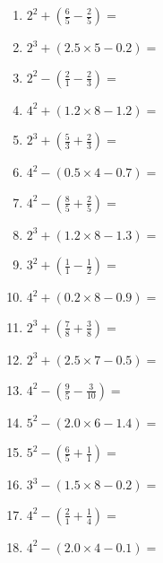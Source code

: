 \documentclass[12pt]{article}
\begin{document}
\begin{enumerate}
\item \large $ 2^{2} + (\frac{6}{5} - \frac{2}{5}) = $ \vspace{1.6cm}
\item \large $ 2^{3} + (2.5 \times 5 - 0.2) = $ \vspace{1.6cm}
\item \large $ 2^{2} - (\frac{2}{1} - \frac{2}{3}) = $ \vspace{1.6cm}
\item \large $ 4^{2} + (1.2 \times 8 - 1.2) = $ \vspace{1.6cm}
\newpage
\item \large $ 2^{3} + (\frac{5}{3} + \frac{2}{3}) = $ \vspace{1.6cm}
\item \large $ 4^{2} - (0.5 \times 4 - 0.7) = $ \vspace{1.6cm}
\item \large $ 4^{2} - (\frac{8}{5} + \frac{2}{5}) = $ \vspace{1.6cm}
\item \large $ 2^{3} + (1.2 \times 8 - 1.3) = $ \vspace{1.6cm}
\item \large $ 3^{2} + (\frac{1}{1} - \frac{1}{2}) = $ \vspace{1.6cm}
\item \large $ 4^{2} + (0.2 \times 8 - 0.9) = $ \vspace{1.6cm}
\item \large $ 2^{3} + (\frac{7}{8} + \frac{3}{8}) = $ \vspace{1.6cm}
\item \large $ 2^{3} + (2.5 \times 7 - 0.5) = $ \vspace{1.6cm}
\item \large $ 4^{2} - (\frac{9}{5} - \frac{3}{10}) = $ \vspace{1.6cm}
\item \large $ 5^{2} - (2.0 \times 6 - 1.4) = $ \vspace{1.6cm}
\newpage
\item \large $ 5^{2} - (\frac{6}{5} + \frac{1}{1}) = $ \vspace{1.6cm}
\item \large $ 3^{3} - (1.5 \times 8 - 0.2) = $ \vspace{1.6cm}
\item \large $ 4^{2} - (\frac{2}{1} + \frac{1}{4}) = $ \vspace{1.6cm}
\item \large $ 4^{2} - (2.0 \times 4 - 0.1) = $ \vspace{1.6cm}

\end{enumerate}
\end{document}
